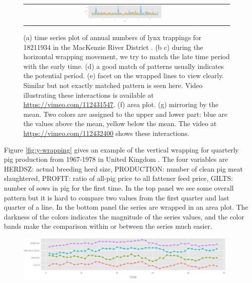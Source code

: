 \documentclass[12pt]{article}
\begin{document}
\begin{itemize}
\begin{center}
\begin{figure}[H]
\begin{centering}
\begin{tabular}{cc}
\includegraphics[width=0.4\textwidth]{graph/pipeline-18-mirrored} \\
\end{tabular}
\end{centering}
\caption{\label{fig:x-wrapping}(a) time series plot of annual numbers of
lynx trappings for 1821\textendash{}1934 in the MacKenzie River District
\citep{campbell1977survey}. (b \textendash{} c) during the horizontal wrapping
movement, we try to match the late time period with the early time.
(d) a good match of patterns usually indicates the potential
period. (e) facet on the wrapped lines to view clearly.
Similar but not exactly matched pattern is seen here.
Video illustrating these interactions is available at
\url{https://vimeo.com/112431547}.
(f) area plot. (g) mirroring by the mean. Two colors are assigned
to the upper and lower part: blue are the values above the mean,
yellow below the mean. The video at \url{https://vimeo.com/112432400}
shows these interactions.}
\end{figure}
\end{center}


Figure \ref{fig:y-wrapping} gives an example of the vertical wrapping
for quarterly pig production from 1967-1978 in United Kingdom \citep{andrews1985data}.
The four variables are HERDSZ: actual breeding herd size, PRODUCTION:
number of clean pig meat slaughtered, PROFIT: ratio of all-pig price
to all fattener feed price, GILTS: number of sows in pig for the first
time. In the top panel we see some overall pattern but it is hard
to compare two values from the first quarter and last quarter of a
line. In the bottom panel the series are wrapped in an area plot.
The darkness of the colors indicates the magnitude of the series values,
and the color bands make the comparison within or between the series
much easier. 


\begin{center}
\begin{figure}[htp]
\begin{centering}
\includegraphics[width=0.98\textwidth]{graph/pipeline-17-original-wp-l}
\end{centering}


\end{figure}
\end{center}
\end{itemize}
\end{document}
